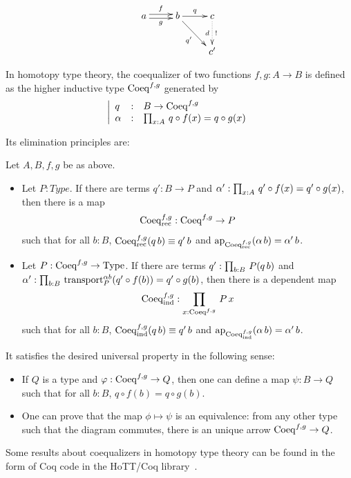 \[ 
  \xymatrix{
    a \ar@<2pt>[r]^f \ar@<-2pt>[r]_g& b \ar[r]^q \ar[rd]_{q'} & c\ar@{.>}[d]^-{!}_-{d} \\
    & & c'
  }
\]

In homotopy type theory, the coequalizer of two functions $f,g:A\to
B$ is defined as the higher inductive type $\mathrm{Coeq}^{f,g}$ generated by
\[
  \left| 
    \begin{array}{lll}
      q&:& B \to \mathrm{Coeq}^{f,g} \\
      \alpha&:& \prod_{x:A}\, q\circ f(x) = q\circ g(x)
    \end{array}
  \right.
\]

Its elimination principles are:
\begin{lem}
  Let $A,B,f,g$ be as above. 
  \begin{itemize}
  \item Let $P:Type$. If there are terms $q':B\to P$ and
    $\alpha':\prod_{x:A}\, q'\circ f (x) = q'\circ g (x)$, then there is
    a map
    \[ \mathrm{Coeq}^{f,g}_{\mathrm{rec}}: \mathrm{Coeq}^{f,g} \to P \]
    such that for all $b:B$, $\mathrm{Coeq}^{f,g}_{\mathrm{rec}}(q\,  b) \equiv
    q'\, b$ and $\mathrm{ap}_{\mathrm{Coeq}^{f,g}_{\mathrm{rec}}}(\alpha\, b) =
    \alpha'\, b$.
  \item Let $P:\mathrm{Coeq}^{f,g} \to \operatorname{Type}$. If there are terms $q':\prod_{b:B}\, P(q\, b)$ and $\alpha':\prod_{b:B}\, \operatorname{transport}_P^{\alpha
        b}(q'\circ f(b)) = q'\circ g(b)$, then there is a dependent
      map
      \[ \mathrm{Coeq}^{f,g}_{\mathrm{ind}}: \prod_{x:\mathrm{Coeq}^{f,g}}\, P\, x\]
      such that for all $b:B$, $\mathrm{Coeq}^{f,g}_{\mathrm{ind}}(q\, b) \equiv
      q'\, b$ and $\mathrm{ap}_{\mathrm{Coeq}^{f,g}_{\mathrm{ind}}}(\alpha\, b) =
      \alpha'\, b$.
  \end{itemize}
\end{lem}

It satisfies the desired universal property in the following sense:
\begin{itemize}
\item If $Q$ is a type and $\varphi:\mathrm{Coeq}^{f,g} \to Q$, then one can
  define a map $\psi:B\to Q$ such that for all $b:B$, $q\circ f(b) =
  q\circ g(b)$.
\item One can prove that the map $\phi \mapsto \psi$ is an
  equivalence: from any other type such that the diagram commutes,
  there is an unique arrow $\mathrm{Coeq}^{f,g} \to Q$.
\end{itemize}

Some results about coequalizers in homotopy type theory can be found
in the form of Coq code in the HoTT/Coq library~\cite{hottlib}.

